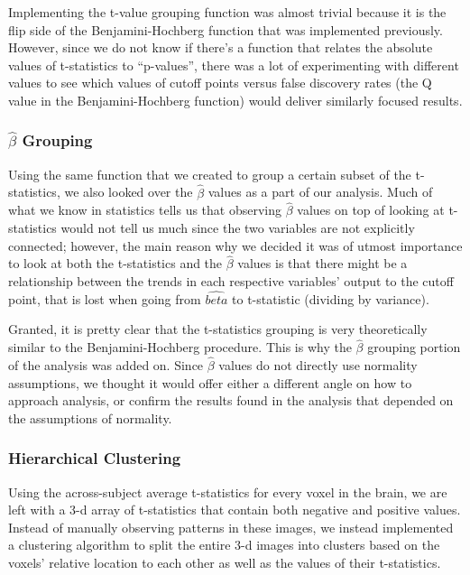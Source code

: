\par Implementing the t-value grouping function was almost trivial because it 
is the flip side of the Benjamini-Hochberg function that was implemented 
previously. However, since we do not know if there's a function that relates 
the absolute values of t-statistics to ``p-values'', there was a lot of 
experimenting with different values to see which values of cutoff points versus
false discovery rates (the Q value in the Benjamini-Hochberg function) would 
deliver similarly focused results.

\subsubsection{$\hat{\beta}$ Grouping}

\par Using the same function that we created to group a certain subset of the 
t-statistics, we also looked over the $\hat{\beta}$ values as a part of our 
analysis. Much of what we know in statistics tells us that observing 
$\hat{\beta}$ values on top of looking at t-statistics would not tell us much 
since the two variables are not explicitly connected; however, the main reason 
why we decided it was of utmost importance to look at both the t-statistics 
and the $\hat{\beta}$ values is that there might be a relationship between the 
trends in each respective variables' output to the cutoff point, that is lost
when going from $\hat{beta}$ to t-statistic (dividing by variance). 

\par Granted, it is pretty clear that the t-statistics grouping is very 
theoretically similar to the Benjamini-Hochberg procedure. This is why the 
$\hat{\beta}$ grouping portion of the analysis was added on. Since $\hat{\beta}$ 
values do not directly use normality assumptions, we thought it would offer 
either a different angle on how to approach analysis, or confirm the results 
found in the analysis that depended on the assumptions of normality. 

\subsubsection{Hierarchical Clustering}

\par Using the across-subject average t-statistics for every voxel in the
brain, we are left with a 3-d array of t-statistics that contain both negative
and positive values. Instead of manually observing patterns in these images, we
instead implemented a clustering algorithm to split the entire 3-d images into
clusters based on the voxels' relative location to each other as well as the
values of their t-statistics.

